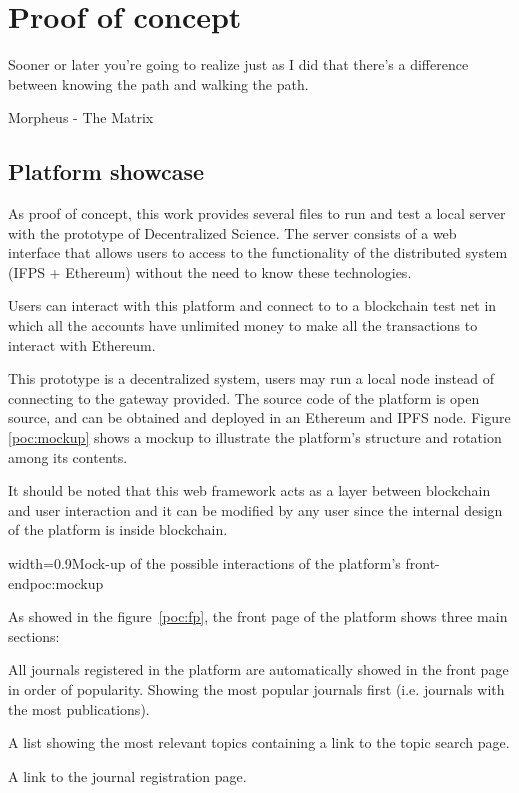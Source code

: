\chapter{Proof of concept}
\label{poc}
\begin{FraseCelebre}
  \begin{Frase}
    Sooner or later you're going to realize just as I did that there's a
    difference between knowing the path and walking the path.
  \end{Frase}
  \begin{Fuente}
    Morpheus - The Matrix
  \end{Fuente}
\end{FraseCelebre}

\section{Platform showcase}

As proof of concept, this work provides several files to run and test a local
server with the prototype of Decentralized Science. The server consists of a web
interface that allows users to access to the functionality of the distributed
system (IFPS + Ethereum) without the need to know these technologies.

Users can interact with this platform and connect to to a blockchain test net in
which all the accounts have unlimited money to make all the transactions to
interact with Ethereum.

This prototype is a decentralized system, users may run a local node instead of
connecting to the gateway provided. The source code of the platform is open
source, and can be obtained and deployed in an Ethereum and IPFS node. Figure
\ref{poc:mockup} shows a mockup to illustrate the platform's structure and
rotation among its contents.

It should be noted that this web framework acts as a layer between blockchain
and user interaction and it can be modified by any user since the internal
design of the platform is inside blockchain.

 {width=0.9\linewidth}{Mock-up of the possible
  interactions of the platform's front-end}{poc:mockup}



As showed in the figure~\ref{poc:fp}, the front page of the platform shows three
main sections:

\begin{itemize}
   All journals registered in
  the platform are automatically showed in the front page in order of
  popularity. Showing the most popular journals first (i.e. journals with the
  most publications).

   A list showing the most relevant topics containing a
  link to the topic search page.

   A link to the journal registration page.

\end{itemize}


